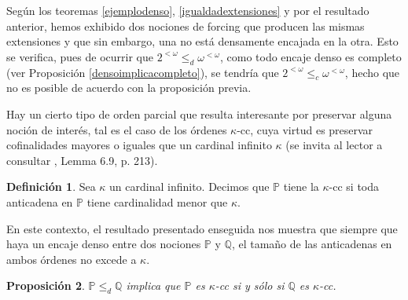\documentclass[11pt]{unam_tesis1}
\theoremstyle{MyThmStyle}
\theoremstyle{definition}
\newtheorem{definition}{Definici\'on}[chapter]
\theoremstyle{plain}
\newtheorem{proposition}[definition]{Proposici\'on}
\theoremstyle{remark}
\let\leq\leqslant
\begin{document}
Seg\'un los teoremas \ref{ejemplodenso}, \ref{igualdadextensiones} y por el resultado anterior, hemos exhibido dos nociones de forcing que producen las mismas extensiones y que sin embargo, una no est\'a densamente encajada en la otra. Esto se verifica, pues de ocurrir que $2^{<\omega}\leq_d \omega^{<\omega}$, como todo encaje denso es completo (ver Proposici\'on \ref{densoimplicacompleto}), se tendr\'ia que $2^{<\omega}\leq_c \omega^{<\omega}$, hecho que no es posible de acuerdo con la proposici\'on previa.

Hay un cierto tipo de orden parcial que resulta interesante por preservar alguna noci\'on de inter\'es, tal es el caso de los \'ordenes $\kappa$-cc, cuya virtud es preservar cofinalidades mayores o iguales que un cardinal infinito $\kappa$ (se invita al lector a consultar \cite{kunen}, Lemma 6.9, p. 213).

\begin{definition}
Sea $\kappa$ un cardinal infinito. Decimos que $\mathbb P$ tiene la $\kappa$-cc si toda anticadena en $\mathbb P$ tiene cardinalidad menor que $\kappa$.
\end{definition}

En este contexto, el resultado presentado enseguida nos muestra que siempre que haya un encaje denso entre dos nociones $\mathbb P$ y $\mathbb Q$, el tama\~no de las anticadenas en ambos \'ordenes no excede a $\kappa$.

\begin{proposition}
$\mathbb P\leq_d \mathbb Q$ implica que $\mathbb P$ es $\kappa$-cc si y s\'olo si $\mathbb Q$ es $\kappa$-cc.
\end{proposition}
\end{document}

